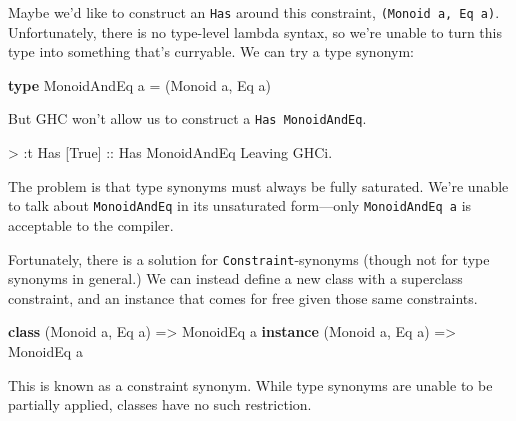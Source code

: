 \documentclass[
  11pt,
]{book}
\newenvironment{Shaded}{}{}
\newcommand{\DataTypeTok}[1]{\textcolor[rgb]{0.56,0.13,0.00}{#1}}
\newcommand{\KeywordTok}[1]{\textcolor[rgb]{0.00,0.44,0.13}{\textbf{#1}}}
\newcommand{\NormalTok}[1]{#1}
\newcommand{\OperatorTok}[1]{\textcolor[rgb]{0.40,0.40,0.40}{#1}}
\newcommand{\OtherTok}[1]{\textcolor[rgb]{0.00,0.44,0.13}{#1}}
\theoremstyle{nonumberplain}
\begin{document}
Maybe we'd like to construct an \texttt{Has} around this constraint,
\texttt{(Monoid\ a,\ Eq\ a)}. Unfortunately, there is no type-level
lambda syntax, so we're unable to turn this type into something that's
curryable. We can try a type synonym:

\begin{Shaded}
\begin{Highlighting}[]
\KeywordTok{type} \DataTypeTok{MonoidAndEq}\NormalTok{ a }\OtherTok{=}\NormalTok{ (}\DataTypeTok{Monoid}\NormalTok{ a, }\DataTypeTok{Eq}\NormalTok{ a)}
\end{Highlighting}
\end{Shaded}

But GHC won't allow us to construct a \texttt{Has\ MonoidAndEq}.

\begin{Shaded}
\begin{Highlighting}[]
\OperatorTok{\textgreater{}} \OperatorTok{:}\NormalTok{t }\DataTypeTok{Has}\NormalTok{ [}\DataTypeTok{True}\NormalTok{]}\OtherTok{ ::} \DataTypeTok{Has} \DataTypeTok{MonoidAndEq}
\DataTypeTok{Leaving} \DataTypeTok{GHCi}\OperatorTok{.}
\end{Highlighting}
\end{Shaded}

The problem is that type synonyms must always be fully saturated. We're
unable to talk about \texttt{MonoidAndEq} in its unsaturated form---only
\texttt{MonoidAndEq\ a} is acceptable to the compiler.

Fortunately, there is a solution for \texttt{Constraint}-synonyms
(though not for type synonyms in general.) We can instead define a new
class with a superclass constraint, and an instance that comes for free
given those same constraints.

\begin{Shaded}
\begin{Highlighting}[]
\KeywordTok{class}\NormalTok{    (}\DataTypeTok{Monoid}\NormalTok{ a, }\DataTypeTok{Eq}\NormalTok{ a) }\OtherTok{=\textgreater{}} \DataTypeTok{MonoidEq}\NormalTok{ a}
\KeywordTok{instance}\NormalTok{ (}\DataTypeTok{Monoid}\NormalTok{ a, }\DataTypeTok{Eq}\NormalTok{ a) }\OtherTok{=\textgreater{}} \DataTypeTok{MonoidEq}\NormalTok{ a}
\end{Highlighting}
\end{Shaded}

This is known as a constraint synonym. While type synonyms are unable to
be partially applied, classes have no such restriction.
\end{document}
